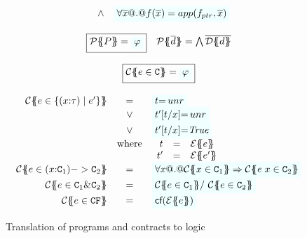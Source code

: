 \begin{figure}
\[\begin{array}{c}
\begin{array}{rcl}
    & \land & \formula{\forall \ol{x} @.@ f(\ol{x}) = app(f_{ptr},\xs)} \\
\end{array}
\\ \\
\ruleform{\ptrans{\Sigma}{P} = \formula{\phi} } \quad
\ptrans{\Sigma}{\ol{d}} = \bigwedge \ol{\dtrans{\Sigma}{d}}
\\ \\
\ruleform{\ctrans{\Sigma}{\Gamma}{e \in \Ct} = \formula{\phi}} \\ \\
\begin{array}{rcl}
\ctrans{\Sigma}{\Gamma}{e \in \{(x{:}\tau) \mid e' \}}
  & = & \formula{t{=}\unr} \\
  & \lor & \formula{t'[t/x]{=}\unr} \\
  & \lor & \formula{t'[t/x]{=}\True} \\
  & \mbox{where} &
    \begin{array}[t]{rcl}
      t  & = & \etrans{\Sigma}{\Gamma}{e} \\
      t' & = & \etrans{\Sigma}{\Gamma}{e'}
    \end{array}
\\
\ctrans{\Sigma}{\Gamma}{e \in (x{:}\Ct_1) -> \Ct_2}
  & = & \formula{\forall x @.@ \ctrans{\Sigma}{\Gamma,x}{x \in \Ct_1}
                          \Rightarrow \ctrans{\Sigma}{\Gamma,x}{e\;x \in \Ct_2}}
\\
\ctrans{\Sigma}{\Gamma}{e \in \Ct_1 \& \Ct_2}
   & = & \formula{ \ctrans{\Sigma}{\Gamma}{e \in \Ct_1} /\ \ctrans{\Sigma}{\Gamma}{e \in \Ct_2}}
\\
\ctrans{\Sigma}{\Gamma}{e \in \CF} & = & \formula{\lcf{\etrans{\Sigma}{\Gamma}{e}}}
\end{array}
\end{array}\]
\caption{Translation of programs and contracts to logic}
   \label{fig:etrans}\label{fig:contracts-minless}
\end{figure}
